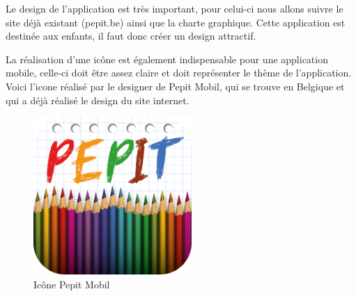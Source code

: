 Le design de l'application est très important, pour celui-ci nous allons suivre le site déjà existant (pepit.be) ainsi que la charte graphique. Cette application est destinée aux enfants, il faut donc créer un design attractif.


La réalisation d'une icône est également indispensable pour une application mobile, celle-ci doit \^{e}tre assez claire et doit représenter le thème de l'application. Voici l'icone réalisé par le designer de Pepit Mobil, qui se trouve en Belgique et qui a déjà réalisé le design du site internet.


\begin{figure}[H]
\begin{center}
\includegraphics[width=6cm]{images/icone}
\end{center}
\caption{Icône Pepit Mobil}
\label{Icone Pepit Mobil}
\end{figure}